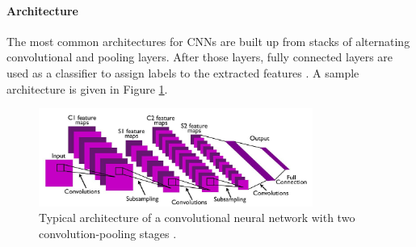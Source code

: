 

\paragraph{Architecture} \label{c:cnnarch}

The most common architectures for CNNs are built up from stacks of alternating convolutional and pooling layers. 
After those layers, fully connected layers are used as a classifier to assign labels to the extracted features \cite{NIPS2012_4824}\cite{simonyan2014very}\cite{szegedy2015going}.
A sample architecture is given in Figure \ref{fig:convarcitecuture}.

\begin{figure}[h!]
	\centering
    	\includegraphics[width=0.8\textwidth]{imgs/cnn_architecture.jpg} 
    \caption{Typical architecture of a convolutional neural network with two convolution-pooling stages \cite{cnnarchImg}.}
	\label{fig:convarcitecuture}
\end{figure}

